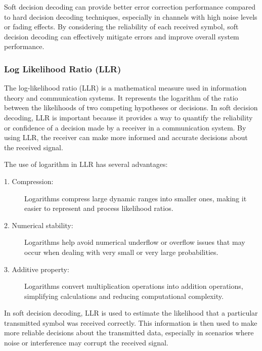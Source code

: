 Soft decision decoding can provide better error correction performance compared to hard decision decoding techniques, especially in channels with high noise levels or fading effects. By considering the reliability of each received symbol, soft decision decoding can effectively mitigate errors and improve overall system performance.

\subsubsection{Log Likelihood Ratio (LLR)}
The log-likelihood ratio (LLR) is a mathematical measure used in information theory and communication systems. It represents the logarithm of the ratio between the likelihoods of two competing hypotheses or decisions.
In soft decision decoding, LLR is important because it provides a way to quantify the reliability or confidence of a decision made by a receiver in a communication system. By using LLR, the receiver can make more informed and accurate decisions about the received signal.

The use of logarithm in LLR has several advantages:
\begin{description}
    \item[1. Compression:] Logarithms compress large dynamic ranges into smaller ones, making it easier to represent and process likelihood ratios.
    \item[2. Numerical stability:] Logarithms help avoid numerical underflow or overflow issues that may occur when dealing with very small or very large probabilities.
    \item[3. Additive property:] Logarithms convert multiplication operations into addition operations, simplifying calculations and reducing computational complexity. 
\end{description}
In soft decision decoding, LLR is used to estimate the likelihood that a particular transmitted symbol was received correctly. This information is then used to make more reliable decisions about the transmitted data, especially in scenarios where noise or interference may corrupt the received signal.

